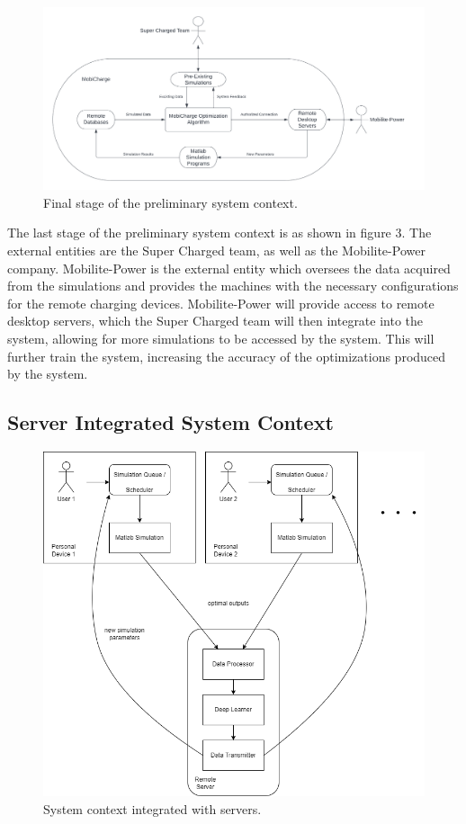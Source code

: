 \documentclass[12pt, titlepage]{article}
\begin{document}
\newpage
\begin{figure}[h]
    \centering
    \includegraphics[width=15cm]{images/context2.png}
    \caption[Prelim System Contexts 3]{Final stage of the preliminary system context.}
    \label{fig:figure3}
\end{figure}
The last stage of the preliminary system context is as shown in figure 3. The external entities are the Super Charged team, as well as the Mobilite-Power company. Mobilite-Power is the external entity which oversees the data acquired from the simulations and provides the machines with the necessary configurations for the remote charging devices. Mobilite-Power will provide access to remote desktop servers, which the Super Charged team will then integrate into the system, allowing for more simulations to be accessed by the system. This will further train the system, increasing the accuracy of the optimizations produced by the system.


\newpage
\subsection{Server Integrated System Context}

\begin{figure}[h]
    \centering
    \includegraphics[width=15cm]{images/server_system.png}
    \caption[Server-Int System Contexts 1]{System context integrated with servers.}
    \label{fig:figure4}
\end{figure}
\end{document}
